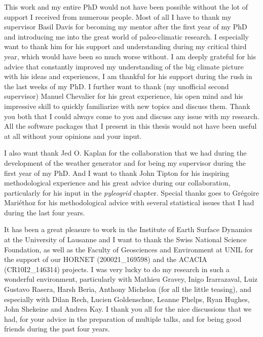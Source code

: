 \begin{acknowledgements}
\addchaptertocentry{\acknowledgementname} %
This work and my entire PhD would not have been possible without the lot of support I received from numerous people. Most of all I have to thank my supervisor Basil Davis for becoming my mentor after the first year of my PhD and introducing me into the great world of paleo-climatic research. I especially want to thank him for his support and understanding during my critical third year, which would have been so much worse without. I am deeply grateful for his advice that constantly improved my understanding of the big climate picture with his ideas and experiences, I am thankful for his support during the rush in the last weeks of my PhD. I further want to thank (my unofficial second supervisor) Manuel Chevalier for his great experience, his open mind and his impressive skill to quickly familiarize with new topics and discuss them. Thank you both that I could always come to you and discuss any issue with my research. All the software packages that I present in this thesis would not have been useful at all without your opinions and your input.

I also want thank Jed O. Kaplan for the collaboration that we had during the development of the weather generator and for being my supervisor during the first year of my PhD. And I want to thank John Tipton for his inspiring methodological experience and his great advice during our collaboration, particularly for his input in the \textit{pyleogrid} chapter. Special thanks goes to Grégoire Mariéthoz for his methodological advice with several statistical issues that I had during the last four years.

 It has been a great pleasure to work in the Institute of Earth Surface Dynamics at the University of Lausanne and I want to thank the Swiss National Science Foundation, as well as the Faculty of Geosciences and Environment at UNIL for the support of our HORNET (200021\_169598) and the ACACIA (CR10I2\_146314) projects. I was very lucky to do my research in such a wonderful environment, particularly with Mathieu Gravey, Inigo Irarrazaval, Luiz Gustavo Rasera, Harsh Beria, Anthony Michelon (for all the little teasing), and especially with Dilan Rech, Lucien Goldenschue, Leanne Phelps, Ryan Hughes, John Shekeine and Andrea Kay. I thank you all for the nice discussions that we had, for your advice in the preparation of multiple talks, and for being good friends during the past four years.
 

\end{acknowledgements}

